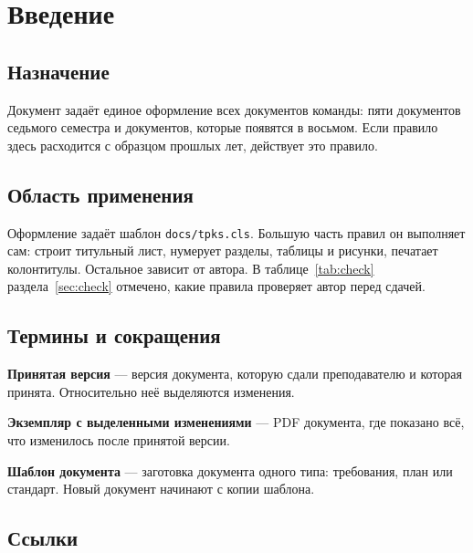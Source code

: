 \documentclass{tpks}
\begin{document}
\makeheader
\begin{changelog}
\end{changelog}

\section{Введение}

\subsection{Назначение}

Документ задаёт единое оформление всех документов команды: пяти документов седьмого семестра и документов, которые появятся в восьмом. Если правило здесь расходится с образцом прошлых лет, действует это правило.

\subsection{Область применения}

Оформление задаёт шаблон \texttt{docs/tpks.cls}. Большую часть правил он выполняет сам: строит титульный лист, нумерует разделы, таблицы и рисунки, печатает колонтитулы. Остальное зависит от автора. В таблице~\ref{tab:check} раздела~\ref{sec:check} отмечено, какие правила проверяет автор перед сдачей.

\subsection{Термины и сокращения}

\textbf{Принятая версия} — версия документа, которую сдали преподавателю и которая принята. Относительно неё выделяются изменения.

\textbf{Экземпляр с выделенными изменениями} — PDF документа, где показано всё, что изменилось после принятой версии.

\textbf{Шаблон документа} — заготовка документа одного типа: требования, план или стандарт. Новый документ начинают с копии шаблона.

\subsection{Ссылки}
\end{document}
